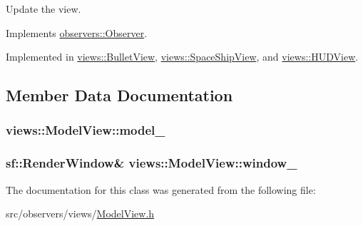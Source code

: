 \-Update the view. 



\-Implements \hyperlink{classobservers_1_1Observer_a71872e29ecdc6a13a99afa39e536710c}{observers\-::\-Observer}.



\-Implemented in \hyperlink{classviews_1_1BulletView_af144914d620bdbb47dc7165c1c270064}{views\-::\-Bullet\-View}, \hyperlink{classviews_1_1SpaceShipView_a25d82746241f5e18ad1b8041b30a9a88}{views\-::\-Space\-Ship\-View}, and \hyperlink{classviews_1_1HUDView_ade6f7d917f515422ed084164a547bd0c}{views\-::\-H\-U\-D\-View}.



\subsection{\-Member \-Data \-Documentation}
\hypertarget{classviews_1_1ModelView_aa54071fac8ab8c182e8f2c5ff7622284}{
\subsubsection[{model\-\_\-}]{ {\bf views\-::\-Model\-View\-::model\-\_\-}}}\label{d8/d67/classviews_1_1ModelView_aa54071fac8ab8c182e8f2c5ff7622284}
\hypertarget{classviews_1_1ModelView_afa1e9f130689ee9055c95183a7f65944}{
\subsubsection[{window\-\_\-}]{\setlength{\rightskip}{0pt plus 5cm}sf\-::\-Render\-Window\& {\bf views\-::\-Model\-View\-::window\-\_\-}}}\label{d8/d67/classviews_1_1ModelView_afa1e9f130689ee9055c95183a7f65944}


\-The documentation for this class was generated from the following file\-:\begin{DoxyCompactItemize}
\item 
src/observers/views/\hyperlink{ModelView_8h}{\-Model\-View.\-h}\end{DoxyCompactItemize}
